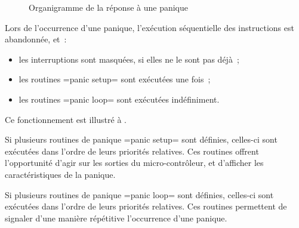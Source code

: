 \begin{figure}[t]
  \centering
  \small
  \caption{Organigramme de la réponse à une panique}
  \ligne
\end{figure}

Lors de l'occurrence d'une panique, l'exécution séquentielle des instructions est abandonnée, et~:
\begin{itemize}
  \item les interruptions sont masquées, si elles ne le sont pas déjà~;
  \item les routines \plm=panic setup= sont exécutées une fois~;
  \item les routines \plm=panic loop= sont exécutées indéfiniment.
\end{itemize}
Ce fonctionnement est illustré à .

Si plusieurs routines de panique \plm=panic setup= sont définies, celles-ci sont exécutées dans l'ordre de leurs priorités relatives. Ces routines offrent l'opportunité d'agir sur les sorties du micro-contrôleur, et d'afficher les caractéristiques de la panique.

Si plusieurs routines de panique \plm=panic loop= sont définies, celles-ci sont exécutées dans l'ordre de leurs priorités relatives. Ces routines permettent de signaler d'une manière répétitive l'occurrence d'une panique.



